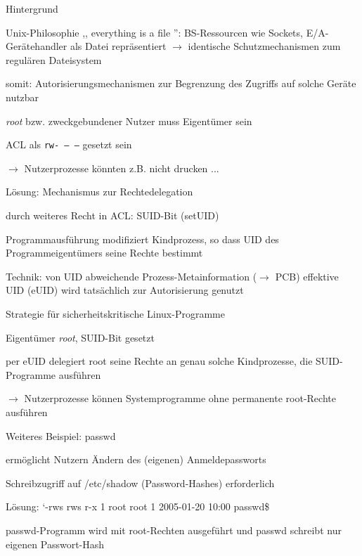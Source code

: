 \documentclass[a4paper]{article}
\begin{document}
\begin{multicols}{3}
    Hintergrund
    \begin{itemize*}
        \item Unix-Philosophie ,, everything is a file '': BS-Ressourcen wie Sockets, E/A-Gerätehandler als Datei repräsentiert $\rightarrow$ identische Schutzmechanismen zum regulären Dateisystem
        \item somit: Autorisierungsmechanismen zur Begrenzung des Zugriffs auf solche Geräte nutzbar
        \begin{itemize*}
            \item \emph{root} bzw. zweckgebundener Nutzer muss Eigentümer sein
            \item ACL als \texttt{rw-\ ---\ ---} gesetzt sein
            \item[$\rightarrow$] Nutzerprozesse könnten z.B. nicht drucken ...
        \end{itemize*}
        \item Lösung: Mechanismus zur Rechtedelegation
        \begin{itemize*}
            \item durch weiteres Recht in ACL: SUID-Bit (setUID)
            \item Programmausführung modifiziert Kindprozess, so dass UID des Programmeigentümers seine Rechte bestimmt
            \item Technik: von UID abweichende Prozess-Metainformation ($\rightarrow$ PCB) effektive UID (eUID) wird tatsächlich zur Autorisierung genutzt
        \end{itemize*}
    \end{itemize*}

    Strategie für sicherheitskritische Linux-Programme
    \begin{itemize*}
        \item Eigentümer \emph{root}, SUID-Bit gesetzt
        \item per eUID delegiert root seine Rechte an genau solche Kindprozesse, die  SUID-Programme ausführen
        \item[$\rightarrow$] Nutzerprozesse können Systemprogramme ohne permanente root-Rechte ausführen
    \end{itemize*}

    Weiteres Beispiel: passwd
    \begin{itemize*}
        \item ermöglicht Nutzern Ändern des (eigenen) Anmeldepassworts
        \item Schreibzugriff auf /etc/shadow (Password-Hashes) erforderlich
        \item Lösung: `-rws rws r-x 1 root root 1 2005-01-20 10:00 passwd\$
        \item passwd-Programm wird mit root-Rechten ausgeführt und passwd schreibt nur eigenen Passwort-Hash
    \end{itemize*}


\end{multicols}
\end{document}
